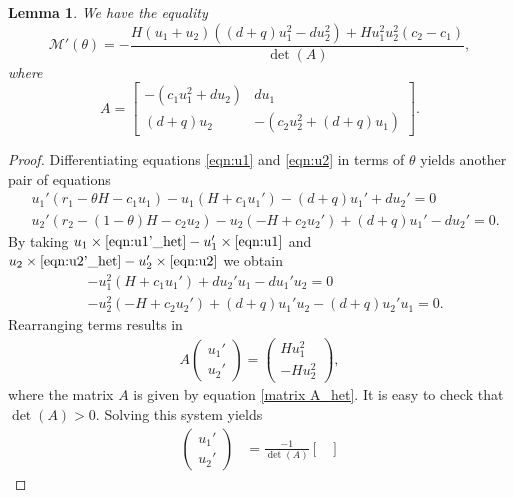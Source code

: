\documentclass[11pt]{article}
\newtheorem{lemma}[theorem]{Lemma}
\def\MM{\mathcal{M}}
\theoremstyle{definition}
\begin{document}
\begin{lemma}\label{lem:M'_hetero}
We have the equality
\begin{equation}\label{eq:M'_het}
    \MM'(\theta)= -\frac{H(u_1+u_2)((d+q)u_1^2-du_2^2)+Hu_1^2u_2^2(c_2-c_1)}{\det(A)},
\end{equation}
where 
\begin{equation}\label{matrix A_het}
A=\begin{bmatrix}
    -(c_1u_1^2+du_2) & du_1\\
    (d+q)u_2 & -(c_2u_2^2+(d+q)u_1)
\end{bmatrix}.
\end{equation}
\end{lemma}
\begin{proof}
Differentiating equations \eqref{eqn:u1} and \eqref{eqn:u2} in terms of $\theta$ yields another pair of equations
\begin{subequations}
    \begin{align}
           &u_1'(r_1-\theta H-c_1u_1)-u_1(H+c_1u_1')-(d+q)u_1'+du_2'=0\label{eqn:u1'_het}\\
           &u_2'(r_2-(1-\theta)H-c_2u_2) - u_2(-H+c_2u_2')+(d+q)u_1'-du_2'=0.\label{eqn:u2'_het}
    \end{align}
\end{subequations}
By taking $u_1\times \eqref{eqn:u1'_het}-u_1'\times \eqref{eqn:u1}$ and $u_2\times \eqref{eqn:u2'_het}-u_2'\times \eqref{eqn:u2}$ we obtain
\begin{subequations}
    \begin{align*}
        &-u_1^2(H+c_1u_1') +du_2'u_1-du_1'u_2=0\\
        &-u_2^2(-H+c_2u_2')+(d+q)u_1'u_2-(d+q)u_2'u_1=0.
    \end{align*}
\end{subequations}
Rearranging terms results in
\begin{align*}
    A\begin{pmatrix} u_1' \\u_2'\end{pmatrix} = \begin{pmatrix} Hu_1^2\\-Hu_2^2\end{pmatrix},
\end{align*}
where the matrix $A$ is given by equation \eqref{matrix A_het}.
It is easy to check that $\det(A)>0$. Solving this system yields
\begin{align*}
    \begin{pmatrix} u_1' \\u_2'\end{pmatrix} &=\frac{-1}{\det(A)} \begin{bmatrix}

\end{bmatrix}
\end{align*}
\end{proof}
\end{document}
